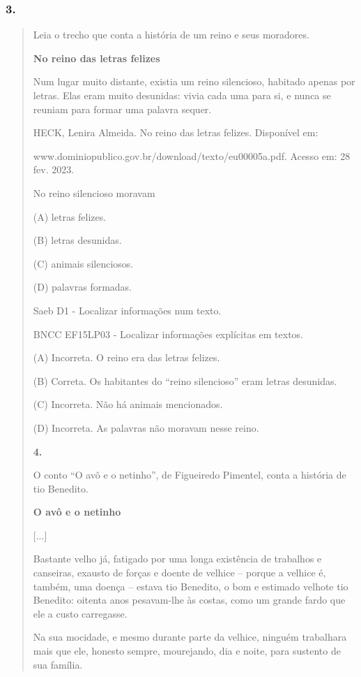 \subsubsection{3. }\label{section-90}

\begin{quote}
Leia o trecho que conta a história de um reino e seus moradores.

\textbf{No reino das letras felizes}

Num lugar muito distante, existia um reino silencioso, habitado apenas
por letras. Elas eram muito desunidas: vivia cada uma para si, e nunca
se reuniam para formar uma palavra sequer.

HECK, Lenira Almeida. No reino das letras felizes. Disponível em:

www.dominiopublico.gov.br/download/texto/eu00005a.pdf. Acesso em: 28
fev. 2023.

No reino silencioso moravam

(A) letras felizes.

(B) letras desunidas.

(C) animais silenciosos.

(D) palavras formadas.

Saeb D1 - Localizar informações num texto.

BNCC EF15LP03 - Localizar informações explícitas em textos.

(A) Incorreta. O reino era das letras felizes.

(B) Correta. Os habitantes do ``reino silencioso'' eram letras
desunidas.

(C) Incorreta. Não há animais mencionados.

(D) Incorreta. As palavras não moravam nesse reino.

\textbf{4.}

O conto ``O avô e o netinho'', de Figueiredo Pimentel, conta a história
de tio Benedito.

\textbf{O avô e o netinho}

{[}...{]}

Bastante velho já, fatigado por uma longa existência de trabalhos e
canseiras, exausto de forças e doente de velhice -- porque a velhice é,
também, uma doença -- estava tio Benedito, o bom e estimado velhote tio
Benedito: oitenta anos pesavam-lhe às costas, como um grande fardo que
ele a custo carregasse.

Na sua mocidade, e mesmo durante parte da velhice, ninguém trabalhara
mais que ele, honesto sempre, mourejando, dia e noite, para sustento de
sua família.


\end{quote}
